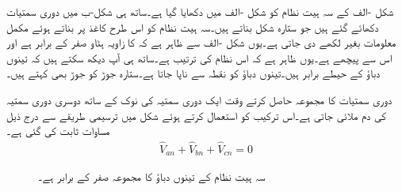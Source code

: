 شکل -الف کے سہ ہیت  نظام کو شکل -الف میں  دکھایا گیا ہے۔ساتھ ہی شکل-ب میں دوری سمتیات دکھائے گئے ہیں جو ستارہ شکل بناتے ہیں۔سہ ہیت نظام کو اس طرح کاغذ پر بناتے ہوئے مکمل معلومات بغیر لکھے دی جاتی ہے۔یوں شکل -الف سے ظاہر ہے کہ  کا زاویہ ہٹاو صفر کے برابر ہے اور  اس سے  پیچھے ہے۔یوں ظاہر ہے کہ اس نظام کی ترتیب  ہے۔ساتھ ہی آپ دیکھ سکتے ہیں کہ تینوں دباؤ کے حیطے برابر ہیں۔تینوں دباؤ کو نقطہ  سے ناپا جاتا ہے۔ستارہ جوڑ کو  جوڑ بھی کہتے ہیں۔

دوری سمتیات کا مجموعہ حاصل کرتے وقت ایک دوری سمتیہ کی نوک کے ساتھ دوسری دوری سمتیہ کی دم ملائی جاتی ہے۔اس ترکیب کو استعمال کرتے ہوئے شکل  میں ترسیمی طریقے سے درج ذیل مساوات ثابت کی گئی ہے۔
\begin{align}
\hat{V}_{an}+\hat{V}_{bn}+\hat{V}_{cn}=0
\end{align} 

\begin{figure}
\centering
{}
\caption{سہ ہیت نظام کے تینوں دباؤ کا مجموعہ صفر کے برابر ہے۔}
\label{شکل_تین_دوری_دباو_مجموعہ_صفر}
\end{figure}

